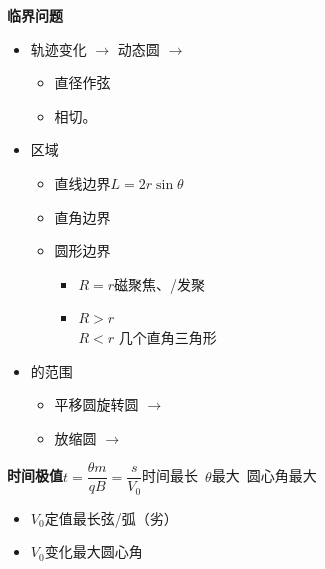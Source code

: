 \textbf{临界问题}
\begin{itemize}
  \item 轨迹变化 $\to$ 动态圆 $\to$
  \begin{itemize}
    \item 直径作弦
    \item 相切。
  \end{itemize}
  \item 区域
  \begin{itemize}
    \item 直线边界\quad $L=2r\sin\theta$
    \item 直角边界
    \item 圆形边界
    \begin{itemize}
      \item $R=r$\quad 磁聚焦、/发聚
      \item $R>r$ \\ $R<r$ \quad 几个直角三角形\quad {}
    \end{itemize}
  \end{itemize}
  \item {}的范围 %
  \begin{itemize}
    \item 平移圆\red{/}旋转圆 $\to$  %
    \item 放缩圆 $\to$  %
  \end{itemize}
\end{itemize}


\noindent{}\par
\noindent{}\par
\noindent{}

\textbf{时间极值}\quad $t=\dfrac{\theta m}{qB}=\dfrac{s}{V_0}$\quad 时间最长\ $\theta$最大\ 圆心角最大
\begin{itemize}
\item $V_0$定值\quad 最长弦/弧（劣）
\item $V_0$变化\quad 最大圆心角
\end{itemize}


